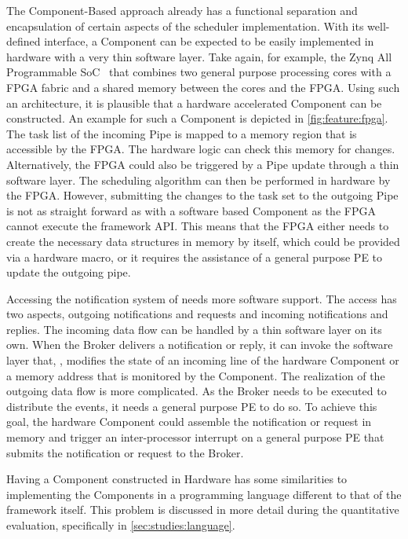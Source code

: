 The Component-Based approach already has a functional separation and encapsulation of certain aspects of the scheduler implementation. With its well-defined interface, a \cobas{} Component can be expected to be easily implemented in hardware with a very thin software layer. Take again, for example, the Zynq All Programmable \ac{SoC}~\cite{Xilinx-2016-Zynq} that combines two general purpose processing cores with a \ac{FPGA} fabric and a shared memory between the cores and the \ac{FPGA}. Using such an architecture, it is plausible that a hardware accelerated Component can be constructed. An example for such a Component is depicted in \cref{fig:feature:fpga}. The task list of the incoming Pipe is mapped to a memory region that is accessible by the \ac{FPGA}. The hardware logic can check this memory for changes. Alternatively, the FPGA could also be triggered by a Pipe update through a thin software layer. The scheduling algorithm can then be performed in hardware by the \ac{FPGA}. However, submitting the changes to the task set to the outgoing Pipe is not as straight forward as with a software based Component as the \ac{FPGA} cannot execute the framework \ac{API}. This means that the \ac{FPGA} either needs to create the necessary data structures in memory by itself, which could be provided via a hardware macro, or it requires the assistance of a general purpose \ac{PE} to update the outgoing pipe.

Accessing the notification system of \cobas{} needs more software support. The access has two aspects, outgoing notifications and requests and incoming notifications and replies. The incoming data flow can be handled by a thin software layer on its own. When the Broker delivers a notification or reply, it can invoke the software layer that, \eg{}, modifies the state of an incoming line of the hardware Component or a memory address that is monitored by the Component. The realization of the outgoing data flow is more complicated. As the Broker needs to be executed to distribute the events, it needs a general purpose \ac{PE} to do so. To achieve this goal, the hardware Component could assemble the notification or request in memory and trigger an inter-processor interrupt on a general purpose \ac{PE} that submits the notification or request to the Broker.

Having a Component constructed in Hardware has some similarities to implementing the Components in a programming language different to that of the framework itself. This problem is discussed in more detail during the quantitative evaluation, specifically in \cref{sec:studies:language}.
